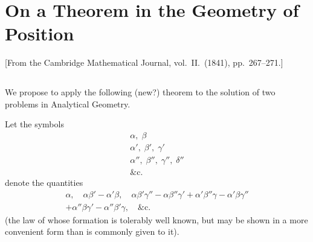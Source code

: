 \documentclass[11pt,a4paper]{book}
\theoremstyle{plain}
\theoremstyle{definition}
\theoremstyle{remark}
\begin{document}
\cleardoublepage

\mainmatter

\chapter{On a Theorem in the Geometry of Position}
\label{chap:paper1}

\begin{center}
\small[From the Cambridge Mathematical Journal, vol.~II.\ (1841), pp.~267--271.]
\end{center}

\section*{}

We propose to apply the following (new?) theorem to the solution of two problems in Analytical Geometry.

Let the symbols
\[
\begin{array}{c}
\alpha, \; \beta \\
\alpha', \; \beta', \; \gamma' \\
\alpha'', \; \beta'', \; \gamma'', \; \delta'' \\
\&\mathrm{c.}
\end{array}
\]
denote the quantities
\begin{multline*}
\alpha, \quad \alpha\beta' - \alpha'\beta, \quad \alpha\beta'\gamma'' - \alpha\beta''\gamma' + \alpha'\beta''\gamma - \alpha'\beta\gamma'' \\
+ \alpha''\beta\gamma' - \alpha''\beta'\gamma, \quad \&\mathrm{c.}
\end{multline*}
(the law of whose formation is tolerably well known, but may be shown in a more convenient form than is commonly given to it).
\end{document}
